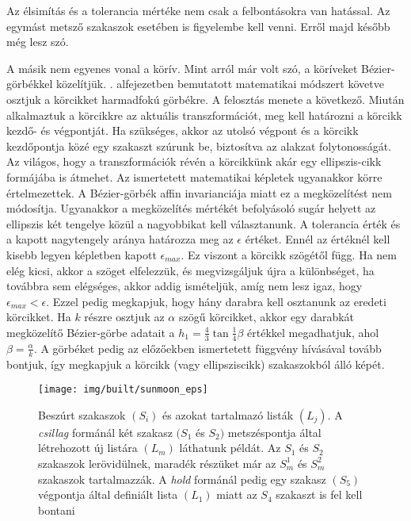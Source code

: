 \documentclass[12pt]{report}
\theoremstyle{definition}
\begin{document}
Az élsimítás és a tolerancia mértéke nem csak a felbontásokra van hatással. Az
egymást metsző szakaszok esetében is figyelembe kell venni. Erről majd később
még lesz szó.

A másik nem egyenes vonal a körív. Mint arról már volt szó, a köríveket
Bézier-görbékkel közelítjük. . alfejezetben bemutatott
matematikai módszert követve osztjuk a körcikket harmadfokú görbékre. A
felosztás menete a következő. Miután alkalmaztuk a körcikkre az aktuális
transzformációt, meg kell határozni a körcikk kezdő- és végpontját. Ha
szükséges, akkor az utolsó végpont és a körcikk kezdőpontja közé egy szakaszt
szúrunk be, biztosítva az alakzat folytonosságát. Az világos, hogy a
transzformációk révén a körcikkünk akár egy ellipszis-cikk formájába is
átmehet. Az ismertetett matematikai képletek ugyanakkor körre értelmezettek. A
Bézier-görbék affin invarianciája miatt ez a megközelítést nem módosítja.
Ugyanakkor a megközelítés mértékét befolyásoló sugár helyett az ellipszis két
tengelye közül a nagyobbikat kell választanunk. A tolerancia érték és a kapott
nagytengely aránya határozza meg az $\epsilon$ értéket. Ennél az értéknél kell
kisebb legyen  képletben kapott $\epsilon_{max}$. Ez viszont a
körcikk szögétől függ. Ha nem elég kicsi, akkor a szöget elfelezzük, és
megvizsgáljuk újra a különbséget, ha továbbra sem elégséges, akkor addig
ismételjük, amíg nem lesz igaz, hogy $\epsilon_{max} < \epsilon$. Ezzel pedig
megkapjuk, hogy hány darabra kell osztanunk az eredeti körcikket. Ha $k$ részre
osztjuk az $\alpha$ szögű körcikket, akkor egy darabkát megközelítő
Bézier-görbe adatait a $h_1 = \frac{4}{3} \tan{\frac{1}{4} \beta}$ értékkel
megadhatjuk, ahol $\beta = \frac{\alpha}{k}$. A görbéket pedig az előzőekben
ismertetett függvény hívásával tovább bontjuk, így megkapjuk a körcikk (vagy
ellipsziscikk) szakaszokból álló képét.

  \begin{figure}
    \centering \texttt{[image: img/built/sunmoon\_eps]}
    \caption{\label{fig:sunmoon} Beszúrt
    szakaszok $(S_i)$ és azokat tartalmazó listák $(L_j)$. A \emph{csillag}
    formánál két szakasz $(S_1$ és $S_2)$ metszéspontja által létrehozott új
    listára $(L_m)$ láthatunk példát. Az $S_1$ és $S_2$ szakaszok
    lerövidülnek, maradék részüket már az $S_m^1$ és $S_m^2$ szakaszok
    tartalmazzák. A \emph{hold} formánál pedig egy szakasz $(S_5)$
    végpontja által definiált lista $(L_1)$ miatt az $S_4$ szakaszt is fel
    kell bontani}
  \end{figure}
\end{document}
